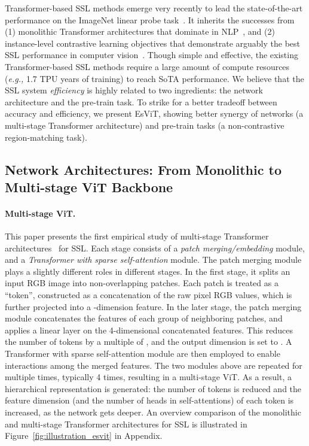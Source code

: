 \documentclass{article} \usepackage{iclr2022_conference,times}
\newcommand{\eg}[0]{\emph{e.g., }}
\newcommand{\shortname}{EsViT}
\begin{document}
Transformer-based SSL methods emerge very recently to lead the state-of-the-art performance on the ImageNet linear probe task~\citep{chen2021empirical,caron2021emerging}. It inherits the successes from (1) monolithic Transformer architectures that dominate in NLP~\citep{devlin2019bert,radford2018improving}, and (2) instance-level contrastive learning objectives that demonstrate arguably the best SSL performance in computer vision~\citep{chen2020simple}.
Though simple and effective, the existing Transformer-based SSL methods require a large amount of compute resources (\eg 1.7 TPU years of training) to reach SoTA performance.
We believe that the SSL system {\em efficiency} is highly related to two ingredients: the network architecture and the pre-train task. To strike for a better tradeoff between accuracy and efficiency, we present \shortname{}, showing better synergy of networks (a multi-stage Transformer architecture) and pre-train tasks (a non-contrastive region-matching task).







\subsection{Network Architectures: From Monolithic to Multi-stage ViT Backbone}
\vspace{-2mm}


\paragraph{Multi-stage ViT.} This paper presents the first empirical study of multi-stage Transformer architectures~\citep{vaswani2021scaling,wang2021pyramid,liu2021Swin,zhang2021vil,wu2021cvt} for SSL. Each stage consists of a {\em patch merging/embedding} module, and a {\em Transformer with sparse self-attention} module.
 The patch merging module plays a slightly different roles in different stages. In the first stage, it splits an input RGB image into non-overlapping
patches. Each patch is treated as a ``token'', constructed as a concatenation of the raw pixel RGB values, which is further projected into a -dimension feature.
In the later stage, the patch merging module concatenates the features of each group of  neighboring patches, and applies a linear layer on the 4-dimensional concatenated features. This reduces the number of tokens by a multiple of , and the output dimension is set to .
 A Transformer with sparse self-attention module are then employed to enable interactions among the merged features. 
The two modules above are repeated for multiple times, typically 4 times, resulting in a multi-stage ViT. As a result, a hierarchical representation is generated: the number of tokens is reduced and the feature dimension (and the number of heads in self-attentions) of each token is increased, as the network
gets deeper. 
An overview comparison of the monolithic and multi-stage Transformer architectures for SSL is illustrated in Figure~\ref{fig:illustration_esvit} in Appendix. 
\end{document}

